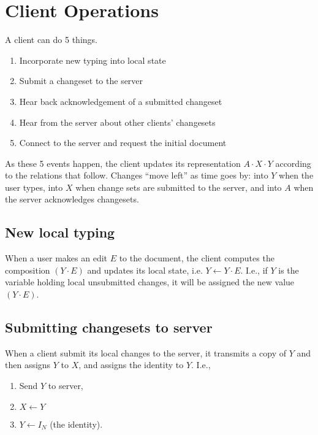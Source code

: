 \documentclass{article}
\begin{document}
\section{Client Operations}

A client can do 5 things.

\begin{enumerate}
\item Incorporate new typing into local state
\item Submit a changeset to the server
\item Hear back acknowledgement of a submitted changeset
\item Hear from the server about other clients' changesets
\item Connect to the server and request the initial document
\end{enumerate}

As these 5 events happen, the client updates its
representation $A\cdot X \cdot Y$ according to the
relations that follow.  Changes ``move left'' as time goes
by: into $Y$ when the user types, into $X$ when change
sets are submitted to the server, and into $A$ when the
server acknowledges changesets.

\subsection{New local typing}

When a user makes an edit $E$ to the document, the client
computes the composition $(Y\cdot E)$ and updates its local
state, i.e. $Y \leftarrow Y\cdot E$.  I.e., if $Y$ is the
variable holding local unsubmitted changes, it will be
assigned the new value $(Y\cdot E)$.

\subsection{Submitting changesets to server}

When a client submit its local changes to the server, it
transmits a copy of $Y$ and then assigns $Y$ to $X$, and
assigns the identity to $Y$.  I.e.,

\begin{enumerate}
\item Send $Y$ to server,
\item $X \leftarrow Y$
\item $Y \leftarrow I_N$
  (the identity).
\end{enumerate}
\end{document}
